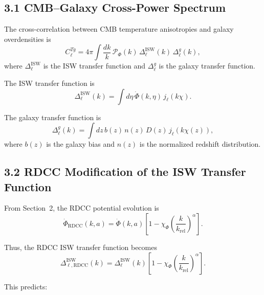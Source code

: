 \documentclass[11pt,a4paper]{article}
\begin{document}
\subsection*{3.1 CMB–Galaxy Cross-Power Spectrum}

The cross-correlation between CMB temperature anisotropies and galaxy overdensities is
\begin{equation}
    C_{\ell}^{Tg}
    = 4\pi \int \frac{dk}{k}\,
      \mathcal{P}_{\Phi}(k)\,
      \Delta_{\ell}^{\mathrm{ISW}}(k)\,
      \Delta_{\ell}^{g}(k),
\end{equation}
where $\Delta_{\ell}^{\mathrm{ISW}}$ is the ISW transfer function and $\Delta_{\ell}^{g}$ is 
the galaxy transfer function.

The ISW transfer function is
\begin{equation}
    \Delta_{\ell}^{\mathrm{ISW}}(k)
    = \int d\eta\,
      \dot{\Phi}(k,\eta)\,
      j_{\ell}(k\chi).
\end{equation}

The galaxy transfer function is
\begin{equation}
    \Delta_{\ell}^{g}(k)
    = \int dz\,
      b(z)\,n(z)\,D(z)\,
      j_{\ell}(k\chi(z)),
\end{equation}
where $b(z)$ is the galaxy bias and $n(z)$ is the normalized redshift distribution.

\subsection*{3.2 RDCC Modification of the ISW Transfer Function}

From Section~2, the RDCC potential evolution is
\begin{equation}
    \dot{\Phi}_{\mathrm{RDCC}}(k,a)
    = \dot{\Phi}(k,a)
      \left[
        1 - \chi_{\Phi}
        \left(\frac{k}{k_{\mathrm{rel}}}\right)^{\alpha}
      \right].
\end{equation}

Thus, the RDCC ISW transfer function becomes
\begin{equation}
    \Delta_{\ell,\mathrm{RDCC}}^{\mathrm{ISW}}(k)
    = \Delta_{\ell}^{\mathrm{ISW}}(k)
      \left[
        1 - \chi_{\Phi}
        \left(\frac{k}{k_{\mathrm{rel}}}\right)^{\alpha}
      \right].
\end{equation}

This predicts:
\end{document}
